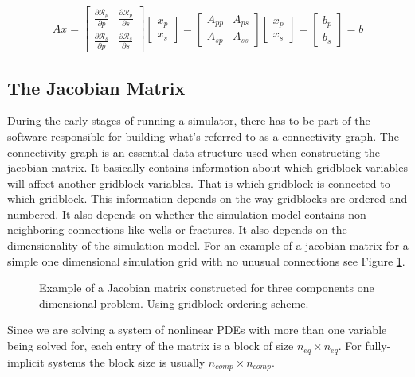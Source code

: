 \begin{equation}
	Ax = 
\begin{bmatrix}
	\frac{\partial\mathcal{R}_{p}}{\partial p}& \frac{\partial\mathcal{R}_{p}}{\partial s}\\
	\frac{\partial\mathcal{R}_{s}}{\partial p}& \frac{\partial\mathcal{R}_{s}}{\partial s}
\end{bmatrix}
\begin{bmatrix}
	x_{p} \\
	x_{s}
\end{bmatrix}
=
\begin{bmatrix}
	A_{pp} & A_{ps}\\
	A_{sp} & A_{ss}
\end{bmatrix}
\begin{bmatrix}
	x_{p} \\
	x_{s}
\end{bmatrix}
=
\begin{bmatrix}
	b_{p} \\
	b_{s}
\end{bmatrix}
=
b
\end{equation}

\subsection{The Jacobian Matrix}
During the early stages of running a simulator, there has to be part of the software responsible for
building what's referred to as a connectivity graph. The connectivity graph is an essential data structure used
when constructing the jacobian matrix. It basically contains information about which gridblock variables will affect
another gridblock variables. That is which gridblock is connected to which gridblock. This information depends on the
way gridblocks are ordered and numbered. It also depends on whether the simulation model contains non-neighboring connections
like wells or fractures. It also depends on the dimensionality of the simulation model. For an example of a jacobian matrix for a 
simple one dimensional simulation grid with no unusual connections see Figure \ref{jacobian}.

\begin{figure}[H]
\resizebox{9.5cm}{!}{}
\caption{Example of a Jacobian matrix constructed for three components one dimensional problem. Using gridblock-ordering scheme.}
\label{jacobian}
\end{figure}
Since we are solving a system of nonlinear PDEs with more than one variable being solved for, each entry of the matrix is a block of size
$n_{eq}\times n_{eq}$. For fully-implicit systems the block size is usually $n_{comp}\times n_{comp}$.

